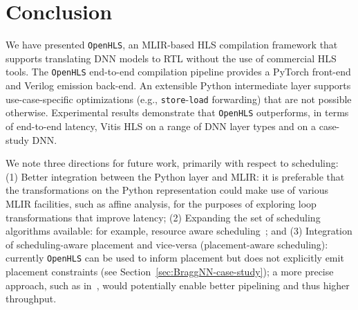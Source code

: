 \documentclass[10pt]{sig-alternate}
\begin{document}
\section{Conclusion}\label{sec:Conclusion}

We have presented \texttt{OpenHLS}, an MLIR-based HLS compilation
framework that supports translating DNN models to RTL without the use of
commercial HLS tools. The \texttt{OpenHLS} end-to-end
compilation pipeline provides a PyTorch front-end and Verilog
emission back-end. An extensible Python
intermediate layer supports use-case-specific optimizations (e.g., \texttt{store}-\texttt{load} forwarding) that are
not possible otherwise. Experimental results demonstrate that \texttt{OpenHLS}
outperforms, in terms of end-to-end latency, Vitis HLS on a range
of DNN layer types and on a case-study DNN.




We note three directions for future work, primarily with respect to scheduling:
(1) Better integration between the Python layer and MLIR: it is preferable that the transformations on the Python representation could make use of various MLIR facilities, such as affine analysis, for the purposes of exploring loop transformations that improve latency;
(2) Expanding the set of scheduling algorithms available: for example, resource aware scheduling~\cite{10.1145/3174243.3174268}; and
(3) Integration of scheduling-aware placement and vice-versa (placement-aware scheduling): currently \texttt{OpenHLS} can be used to inform placement but does not explicitly emit placement constraints (see Section~\ref{sec:BraggNN-case-study}); a more precise approach, such as in~\cite{10.1145/3431920.3439289}, would potentially enable better pipelining and thus higher throughput.




% 


\end{document}
